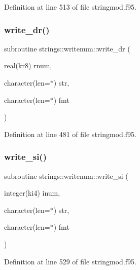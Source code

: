 Definition at line 513 of file stringmod.\+f95.

\mbox{\label{interfacestrings_1_1writenum_a41519a1d4a27d51318cbdbd6c02ada41}} 
\subsubsection{\texorpdfstring{write\+\_\+dr()}{write\_dr()}}
{\footnotesize\ttfamily subroutine strings\+::writenum\+::write\+\_\+dr (\begin{DoxyParamCaption}\item[{real(kr8)}]{rnum,  }\item[{character(len=$\ast$)}]{str,  }\item[{character(len=$\ast$)}]{fmt }\end{DoxyParamCaption})}



Definition at line 481 of file stringmod.\+f95.

\mbox{\label{interfacestrings_1_1writenum_a7cd46c3fce679fe99b15b5f38cda22c5}} 
\subsubsection{\texorpdfstring{write\+\_\+si()}{write\_si()}}
{\footnotesize\ttfamily subroutine strings\+::writenum\+::write\+\_\+si (\begin{DoxyParamCaption}\item[{integer(ki4)}]{inum,  }\item[{character(len=$\ast$)}]{str,  }\item[{character(len=$\ast$)}]{fmt }\end{DoxyParamCaption})}



Definition at line 529 of file stringmod.\+f95.

\mbox{\label{interfacestrings_1_1writenum_a057712cfbe8449b5c0f9ccb80a50c68e}} 
